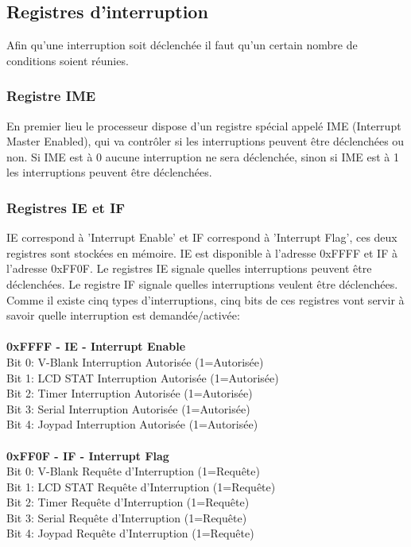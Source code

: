\documentclass{report}
\begin{document}
\subsection{Registres d'interruption}
Afin qu'une interruption soit déclenchée il faut qu'un certain nombre de conditions soient réunies.
\subsubsection{Registre IME}
En premier lieu le processeur dispose d'un registre spécial appelé IME (Interrupt Master Enabled), qui va contrôler si les interruptions peuvent être déclenchées ou non. Si IME est à 0 aucune interruption ne sera déclenchée, sinon si IME est à 1 les interruptions peuvent être déclenchées.
\subsubsection{Registres IE et IF} 
IE correspond à 'Interrupt Enable' et IF correspond à 'Interrupt Flag', ces deux registres sont stockées en mémoire. IE est disponible à l'adresse 0xFFFF et IF à l'adresse 0xFF0F. Le registres IE signale quelles interruptions peuvent être déclenchées. Le registre IF signale quelles interruptions veulent être déclenchées.
Comme il existe cinq types d'interruptions, cinq bits de ces registres vont servir à savoir quelle interruption est demandée/activée:\\\\
\textbf{0xFFFF - IE - Interrupt Enable} \\
Bit 0: V-Blank  Interruption Autorisée  (1=Autorisée)\\
Bit 1: LCD STAT Interruption Autorisée  (1=Autorisée)\\
Bit 2: Timer    Interruption Autorisée  (1=Autorisée)\\
Bit 3: Serial   Interruption Autorisée  (1=Autorisée)\\
Bit 4: Joypad   Interruption Autorisée  (1=Autorisée)\\\\
\textbf{0xFF0F - IF - Interrupt Flag} \\
Bit 0: V-Blank  Requête d'Interruption  (1=Requête)\\
Bit 1: LCD STAT Requête d'Interruption  (1=Requête)\\
Bit 2: Timer    Requête d'Interruption  (1=Requête)\\
Bit 3: Serial   Requête d'Interruption  (1=Requête)\\
Bit 4: Joypad   Requête d'Interruption  (1=Requête)\\\\
\end{document}
